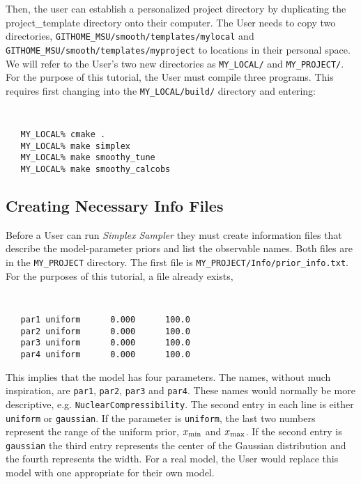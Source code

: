 \documentclass[UserManual.tex]{subfiles}
\begin{document}
Then, the user can establish a personalized project directory by duplicating the project\_template directory onto their computer. The User needs to copy two directories, {\tt GITHOME\_MSU/smooth/templates/mylocal} and {\tt GITHOME\_MSU/smooth/templates/myproject} to locations in their personal space. We will refer to the User's two new directories as {\tt MY\_LOCAL/} and {\tt MY\_PROJECT/}. For the purpose of this tutorial, the User must compile three programs. This requires first changing into the {\tt MY\_LOCAL/build/} directory and entering:
{\tt
\begin{verbatim}
   MY_LOCAL% cmake .
   MY_LOCAL% make simplex
   MY_LOCAL% make smoothy_tune
   MY_LOCAL% make smoothy_calcobs
\end{verbatim}
}

\subsection{Creating Necessary Info Files}
Before a User can run {\it Simplex Sampler} they must create information files that describe the model-parameter priors and list the observable names. Both files are in the {\tt MY\_PROJECT} directory. The first file is {\tt MY\_PROJECT/Info/prior\_info.txt}. For the purposes of this tutorial, a file already exists,
{\tt
\begin{verbatim}
   par1 uniform      0.000      100.0
   par2 uniform      0.000      100.0
   par3 uniform      0.000      100.0
   par4 uniform      0.000      100.0
\end{verbatim}
}
This implies that the model has four parameters. The names, without much inspiration, are {\tt par1}, {\tt par2}, {\tt par3} and {\tt par4}. These names would normally be more descriptive, e.g. {\tt NuclearCompressibility}. The second entry in each line is either {\tt uniform} or {\tt gaussian}. If the parameter is {\tt uniform}, the last two numbers represent the range of the uniform prior, $x_{\rm min}$ and $x_{\rm max}$. If the second entry is {\tt gaussian} the third entry represents the center of the Gaussian distribution and the fourth represents the width. For a real model, the User would replace this model with one appropriate for their own model.
\end{document}
